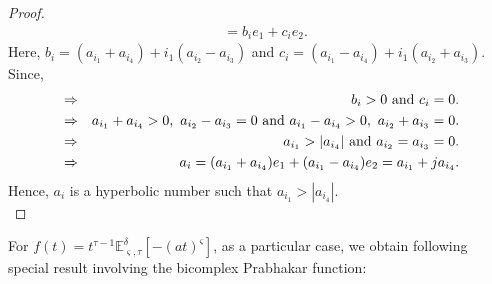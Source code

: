 \documentclass[a4paper,12pt]{article}
\theoremstyle{remark}
\begin{document}
\begin{proof}
\begin{equation}
\begin{split}
&=b_i e_1+c_i e_2.
\end{split}
\end{equation}
	Here,  $b_i= (a_{i_1}+a_{i_4}) +i_1(a_{i_2}-a_{i_3})$ and $c_i= (a_{i_1}-a_{i_4}) +i_1(a_{i_2}+a_{i_3}).$\\
	Since,
\begin{eqnarray}
&\Rightarrow&b_i>0 \text{ and} ~ c_i=0.\notag \\
&\Rightarrow& a_{i_1}+a_{i_4}>0, ~a_{i_2}-a_{i_3}=0~\text{and}~ a_{i_1}-a_{i_4}>0 ,~a_{i_2}+a_{i_3}=0. \notag \\
&	\Rightarrow& a_{i_1}> |a_{i_4}|~\text{and}~ a_{i_2}=a_{i_3}=0.\\
&	\Rightarrow &	a_i=(a_{i_1} +a_{i_4})e_1+(a_{i_1} -a_{i_4})e_2=a_{i_1} +ja_{i_4}.\label{eq :an equi}	
\end{eqnarray}	
Hence, $a_i $ is a hyperbolic number such that $a_{i_1}> |a_{i_4}|.$ \\


\end{proof}

\noindent For $f(t)=t^{\tau -1}\mathbb{E}_{ \varsigma,\tau}^\delta[-(a t)^{ \varsigma}]$, as a particular case, we obtain following  special result involving the bicomplex Prabhakar function: 
\end{document}
